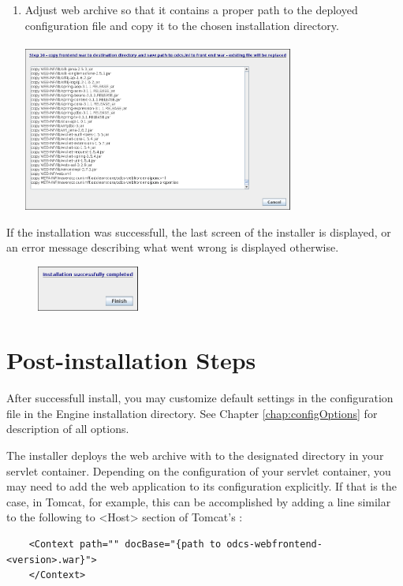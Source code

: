 \begin{enumerate}
    \item Adjust \FE web archive so that it contains a proper path to the deployed configuration file and copy it to the chosen \FE installation directory.
        \\\\ \includegraphics[width=0.7\textwidth]{images/install-step-10.png}
\end{enumerate}

If the installation was successfull, the last screen of the installer is displayed, or an error message describing what went wrong is displayed otherwise.

\begin{figure}[!h]
    \centering
    \includegraphics[width=0.3\textwidth]{images/install-step-11.png}
    \end{figure}
\FloatBarrier


\section{Post-installation Steps}
After successfull install, you may customize default \odcs settings in the configuration file  in the Engine installation directory. See Chapter \ref{chap:configOptions} for description of all options.

The installer deploys the web archive with \FE to the designated directory in your servlet container. Depending on the configuration of your servlet container, you may need to add the \FE web application to its configuration explicitly. If that is the case, in Tomcat, for example, this can be accomplished by adding a line similar to the following to \textless{}Host\textgreater{} section of Tomcat's :  
\begin{verbatim} 
    <Context path="" docBase="{path to odcs-webfrontend-<version>.war}">
    </Context>
\end{verbatim} 

